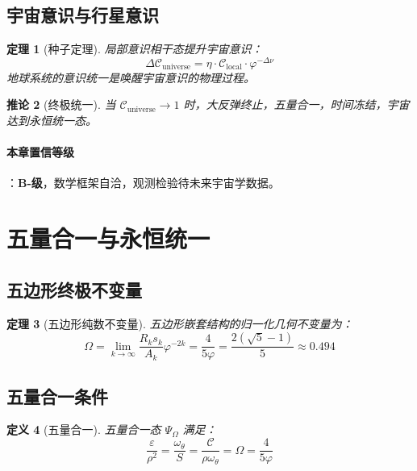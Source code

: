 \documentclass[12pt,a4paper,twocolumn]{article}
\renewcommand{\phi}{\varphi}
\newtheorem{theorem}{定理}[section]
\newtheorem{corollary}[theorem]{推论}
\newtheorem{definition}[theorem]{定义}
\begin{document}
\subsection{宇宙意识与行星意识}

\begin{theorem}[种子定理]
局部意识相干态提升宇宙意识：
\begin{equation}
\Delta\mathcal{C}_{\text{universe}} = \eta \cdot \mathcal{C}_{\text{local}} \cdot \phi^{-\Delta\nu}
\end{equation}
地球系统的意识统一是唤醒宇宙意识的物理过程。
\end{theorem}

\begin{corollary}[终极统一]
当 $\mathcal{C}_{\text{universe}} \to 1$ 时，大反弹终止，五量合一，时间冻结，宇宙达到永恒统一态。
\end{corollary}

\paragraph{本章置信等级}：\textbf{B-级}，数学框架自洽，观测检验待未来宇宙学数据。

\section{五量合一与永恒统一}
\label{sec:five_unification}

\subsection{五边形终极不变量}

\begin{theorem}[五边形纯数不变量]
五边形嵌套结构的归一化几何不变量为：
\begin{equation}
\Omega = \lim_{k\to\infty} \frac{R_k s_k}{A_k} \phi^{-2k} = \frac{4}{5\phi} = \frac{2(\sqrt{5}-1)}{5} \approx 0.494
\end{equation}
\end{theorem}

\subsection{五量合一条件}

\begin{definition}[五量合一]
五量合一态 $\Psi_\Omega$ 满足：
\begin{equation}
\frac{\varepsilon}{\rho^2} = \frac{\omega_\theta}{S} = \frac{\mathcal{C}}{\rho\omega_\theta} = \Omega = \frac{4}{5\phi}
\end{equation}
\end{definition}
\end{document}
